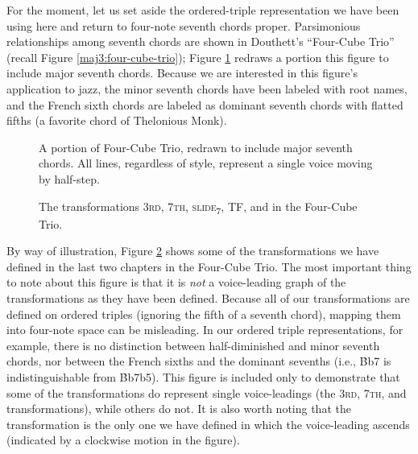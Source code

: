 For the moment, let us set aside the ordered-triple representation we have
been using here and return to four-note seventh chords proper. Parsimonious
relationships among seventh chords are shown in Douthett's ``Four-Cube Trio''
(recall Figure \ref{maj3:four-cube-trio}); Figure \ref{pvl:four-cube-correct}
redraws a portion this figure to include major seventh chords.
Because we are interested in this figure's application to jazz, the minor
seventh chords have been labeled with root names, and the French sixth chords
are labeled as dominant seventh chords with flatted fifths (a favorite chord of
Thelonious Monk).

\begin{figure}[tbp]
  \caption[A portion of Four-Cube Trio, redrawn to include major seventh
  chords.]{A portion of Four-Cube Trio, redrawn to include major seventh
    chords. All lines, regardless of style, represent a single voice moving by
    half-step.}
  \label{pvl:four-cube-correct}
\end{figure}

\begin{figure}[tbp]
  \caption{The transformations 3\textsc{rd}, 7\textsc{th},
    \textsc{slide}\textsubscript{7}, TF, and \tft in the Four-Cube Trio.}
  \label{pvl:four-cube-transformations}
\end{figure}

By way of illustration, Figure \ref{pvl:four-cube-transformations} shows some
of the transformations we have defined in the last two chapters in the
Four-Cube Trio. The most important thing to note about this figure is that it
is \emph{not} a voice-leading graph of the transformations as they have been
defined. Because all of our transformations are defined on ordered triples
(ignoring the fifth of a seventh chord), mapping them into four-note space can
be misleading. In our ordered triple representations, for example, there is no
distinction between half-diminished and minor seventh chords, nor between the
French sixths and the dominant sevenths (i.e., \h{Bb7} is indistinguishable
from \h{Bb7b5}). This figure is included only to demonstrate that some of the
transformations do represent single voice-leadings (the \textsc{3rd},
\textsc{7th}, and \slideS transformations), while others do not. It is also
worth noting that the \slideS transformation is the only one we have defined
in which the voice-leading ascends (indicated by a clockwise motion in the figure).

